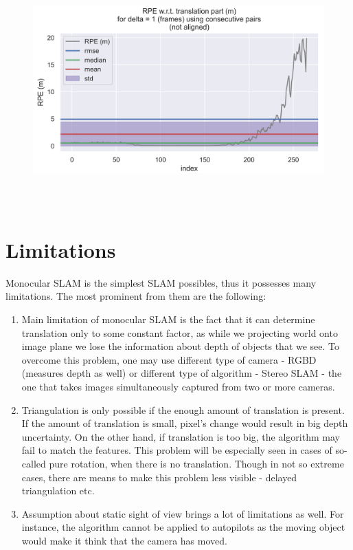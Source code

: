 \begin{figure}[!htb]
\includegraphics[height=9cm, width=15cm]{results/rel_err.png}
\end{figure}

\pagebreak
\section{Limitations}

Monocular SLAM is the simplest SLAM possibles, thus it possesses many limitations. The most prominent from them are the following:

\begin{enumerate}
    \item Main limitation of monocular SLAM is the fact that it can determine translation only to some constant factor, as while we projecting world onto image plane we lose the information about depth of objects that we see. To overcome this problem, one may use different type of camera - RGBD (measures depth as well) or different type of algorithm - Stereo SLAM - the one that takes images simultaneously captured from two or more cameras. 
    \item Triangulation is only possible if the enough amount of translation is present. If the amount of translation is small, pixel's change would result in big depth uncertainty. On the other hand, if translation is too big, the algorithm may fail to match the features. This problem will be especially seen in cases of so-called pure rotation, when there is no translation. Though in not so extreme cases, there are means to make this problem less visible - delayed triangulation etc.
    \item Assumption about static sight of view brings a lot of limitations as well.  For instance, the algorithm cannot be applied to autopilots as the moving object would make it think that the camera has moved. 
\end{enumerate}

